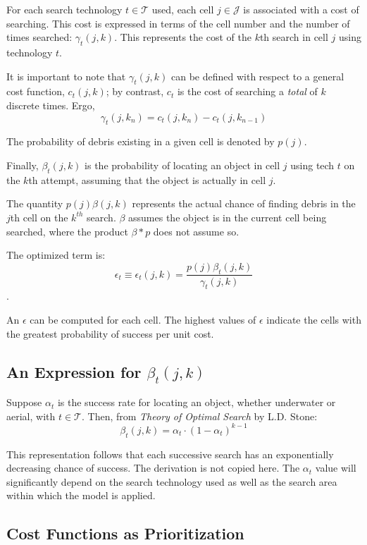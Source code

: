 \documentclass[a4paper]{article}
\begin{document}
For each search technology $t\in\mathcal{T}$ used, each cell $j\in\mathcal{J}$ is associated with a cost of searching. This cost is expressed in terms of the cell number and the number of times searched: $\gamma_t(j,k)$. This represents the cost of the $k$th search in cell $j$ using technology $t$.

It is important to note that $\gamma_t(j,k)$ can be defined with respect to a general cost function, $c_t(j,k)$; by contrast, $c_t$ is the cost of searching  a \textit{total} of $k$ discrete times. Ergo, $$\gamma_t(j,k_n)=c_t(j,k_n)-c_t(j,k_{n-1})$$

The probability of debris existing in a given cell is denoted by $p(j)$.

Finally, $\beta_t(j,k)$ is the probability of locating an object in cell $j$ using tech $t$ on the $k$th attempt, assuming that the object is actually in cell $j$.

The quantity $p(j)\beta(j,k)$ represents the actual chance of finding debris in the $j$th cell on the $k^{th}$ search. $\beta$ assumes the object is in the current cell being searched, where the product $\beta * p$ does not assume so.

The optimized term is: $$\epsilon_t\equiv\epsilon_t(j,k)=\frac{p(j)\beta_t(j,k)}{\gamma_t(j,k)}$$. 

An $\epsilon$ can be computed for each cell. The highest values of $\epsilon$ indicate the cells with the greatest probability of success per unit cost. 

\subsection{An Expression for $\beta_t(j,k)$}

Suppose $\alpha_t$ is the success rate for locating an object, whether underwater or aerial, with $t\in\mathcal{T}$. Then, from \textit{Theory of Optimal Search} by L.D. Stone: \[\beta_t(j,k)=\alpha_t\cdot(1-\alpha_t)^{k-1}\]

This representation follows that each successive search has an exponentially decreasing chance of success. The derivation is not copied here. The $\alpha_t$ value will significantly depend on the search technology used as well as the search area within which the model is applied.

\subsection{Cost Functions as Prioritization}
\end{document}
